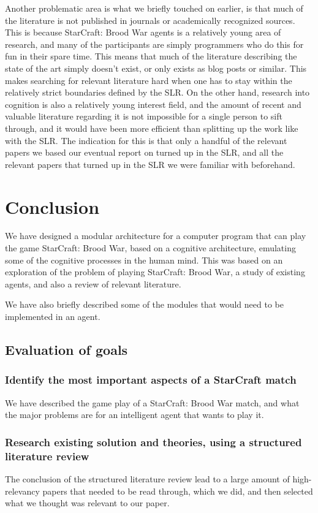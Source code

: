Another problematic area is what we briefly touched on earlier, is that much of
the literature is not published in journals or academically recognized sources.
This is because StarCraft: Brood War agents is a relatively young area of
research, and many of the participants are simply programmers who do this for
fun in their spare time. This means that much of the literature describing the
state of the art simply doesn't exist, or only exists as blog posts or similar.
This makes searching for relevant literature hard when one has to stay within
the relatively strict boundaries defined by the SLR. On the other hand,
research into cognition is also a relatively young interest field, and the
amount of recent and valuable literature regarding it is not impossible for a
single person to sift through, and it would have been more efficient than
splitting up the work like with the SLR. The indication for this is that only a
handful of the relevant papers we based our eventual report on turned up in the
SLR, and all the relevant papers that turned up in the SLR we were familiar
with beforehand.

\section{Conclusion}
We have designed a modular architecture for a computer program that can play the
game StarCraft: Brood War, based on a cognitive architecture, emulating some of
the cognitive processes in the human mind. This was based on an exploration of
the problem of playing StarCraft: Brood War, a study of existing agents, and
also a review of relevant literature.

We have also briefly described some of the modules that would need to be
implemented in an agent.

\subsection{Evaluation of goals}
\subsubsection{Identify the most important aspects of a StarCraft match}
We have described the game play of a StarCraft: Brood War match, and what the
major problems are for an intelligent agent that wants to play it.
\subsubsection{Research existing solution and theories, using a structured
literature review}
The conclusion of the structured literature review lead to a large amount of
high-relevancy papers that needed to be read through, which we did, and then
selected what we thought was relevant to our paper.
